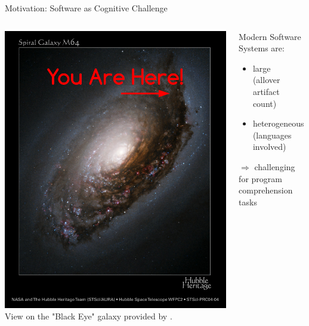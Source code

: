 \documentclass{beamer}
\begin{document}
\begin{frame}{Motivation: Software as Cognitive Challenge}
\begin{columns}
\begin{column}{0.5\textwidth}
\begin{center}
\includegraphics[width=\textwidth]{YouAreHere.png}
\newline
\footnotesize
View on the "Black Eye" galaxy provided by \cite{BlackEyeGalaxy}.
\end{center}
\end{column}
\begin{column}{0.5\textwidth}
Modern Software Systems are:
\begin{itemize}
\item
large\\(allover artifact count)
\item
heterogeneous\\(languages involved)
\end{itemize}
$\Rightarrow$
challenging for program comprehension tasks 
\end{column}
\end{columns}
\end{frame}
\end{document}
